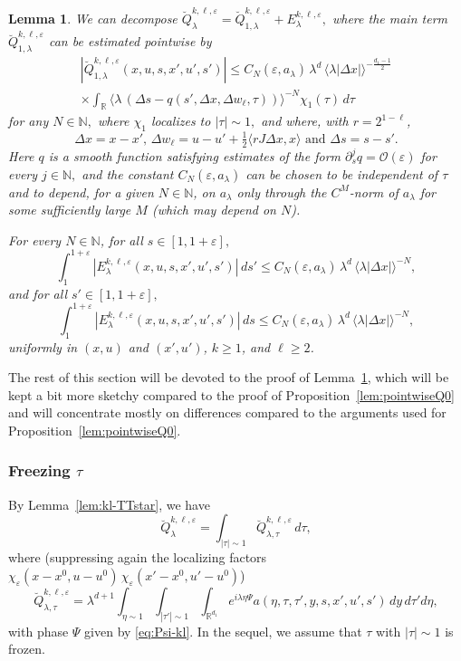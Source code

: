 \documentclass[leqno]{amsart}
\newtheorem{lemma}[theorem]{Lemma}
\theoremstyle{definition}
\theoremstyle{remark}
\numberwithin{equation}{section}
\newcommand{\R}{\mathbb{R}}
\newcommand{\N}{\mathbb{N}}
\newcommand\la{{\lambda}}
\newcommand\ve{{\varepsilon}}
\begin{document}
\begin{lemma}\label{lem:pointwiseQkl-prec}
We can decompose $\breve Q^{k,\ell,\varepsilon}_\la=\breve Q^{k,\ell,\varepsilon}_{1,\lambda}+E^{k,\ell,\varepsilon}_\la,$ where the main term 
$\breve Q^{k,\ell,\varepsilon}_{1,\la}$ can be estimated pointwise by 
\begin{multline}\label{eq:pointwiseQkl}
|\breve Q^{k,\ell,\varepsilon}_{1,\la}(x,u,s,x',u',s')| \le C_N(\ve,a_\la)\, \lambda^d
\, \langle\lambda\left|\Delta x\right|\rangle^{-\frac{d_1-1}2} \\
\times \int_\R \big\langle \lambda\, (\Delta s - q(s',\Delta x,\Delta w_\ell,\tau) ) \big\rangle^{-N} \chi_1(\tau)\, d\tau
\end{multline}
for any $N\in\N,$ where $\chi_1$ localizes to $|\tau|\sim 1,$ and where, with $r=2^{1-\ell}$,
\[
\Delta x = x-x',\, \Delta w_\ell = u-u' +\tfrac 12\langle rJ\Delta x,x\rangle \text{ and }\Delta s=s-s'.
\] 
Here $q$ is a smooth function satisfying estimates of the form $\partial^j_s q=\mathcal O(\ve)$ for every $j\in\N,$
and the  constant $C_N(\ve,a_\la)$ can be chosen to be independent of $\tau$ and to depend, for a given $N\in\N$, on $a_\la$ only through the $C^M$-norm of $a_\la$ for some sufficiently large $M$ (which may depend on $N$). 

For every $N\in \N$, for all $s\in[1,1+\ve],$
\[
\int_1^{1+\ve}| E^{k,\ell,\varepsilon}_\la(x,u,s,x',u',s')|\, ds'  
\le C_N(\ve,a_\la)\, \lambda^d
\, \langle\lambda\left|\Delta x\right|\rangle^{-N} ,
\]
and for all $s'\in[1,1+\ve],$
\[
\int_1^{1+\ve}| E^{k,\ell,\varepsilon}_\la(x,u,s,x',u',s')|\, ds 
\le C_N(\ve,a_\la)\, \lambda^d
\, \langle\lambda\left|\Delta x\right|\rangle^{-N}  ,
\]
uniformly in $(x,u)$ and $(x',u')$, $k\ge 1$, and $\ell\ge 2$.
\end{lemma}

The rest of this section will be  devoted to the proof of Lemma~\ref{lem:pointwiseQkl-prec}, which will be kept a bit more sketchy compared to the proof of Proposition~\ref{lem:pointwiseQ0} and will concentrate mostly on differences compared to the arguments used for Proposition~\ref{lem:pointwiseQ0}.


\subsubsection{Freezing $\tau$}
By Lemma~\ref{lem:kl-TTstar}, we have
\[
\breve Q^{k,\ell,\varepsilon}_{\lambda}
 =  \int_{|\tau|\sim1}  \breve Q^{k,\ell,\varepsilon}_{\lambda,\tau} \, d\tau ,
\]
where (suppressing again the localizing factors $\chi_\varepsilon(x-x^0,u-u^0)\,\chi_\varepsilon(x'-x^0,u'-u^0)$) 
\begin{equation}
\breve Q^{k,\ell,\varepsilon}_{\lambda,\tau} =\lambda^{d+1} \int_{\eta\sim 1} \int_{|\tau'|\sim 1} \int_{\R^{d_1}} e^{i\lambda \eta \Psi} a(\eta,\tau,\tau',y,s,x',u',s') \, dy \, d\tau' d\eta, \label{eq:q-kl}
\end{equation}
with phase $\Psi$ given by \eqref{eq:Psi-kl}. In the sequel, we assume that  $\tau$ with $|\tau|\sim 1$ is frozen.
\end{document}
